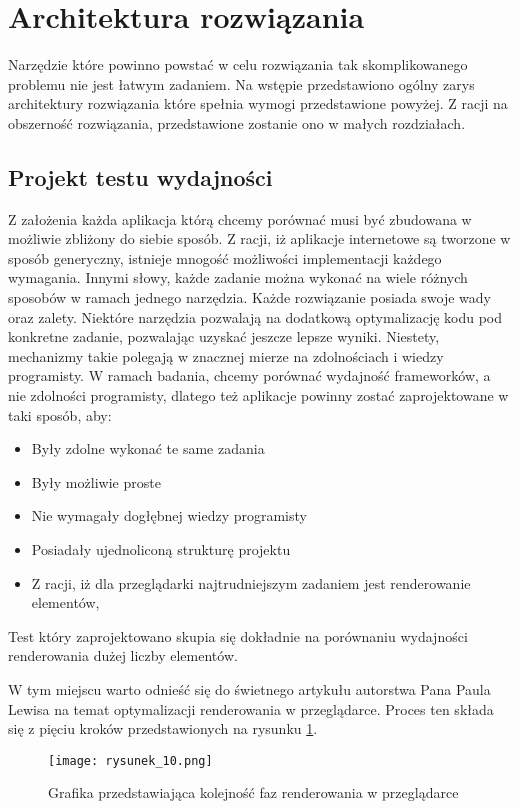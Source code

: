 \section{Architektura rozwiązania}

Narzędzie które powinno powstać w celu rozwiązania tak skomplikowanego problemu nie jest łatwym zadaniem.
Na wstępie przedstawiono ogólny zarys architektury rozwiązania które spełnia wymogi przedstawione powyżej.
Z racji na obszerność rozwiązania, przedstawione zostanie ono w małych rozdziałach.

\subsection{Projekt testu wydajności}
Z założenia każda aplikacja którą chcemy porównać musi być zbudowana w możliwie zbliżony do siebie sposób.
Z racji, iż aplikacje internetowe są tworzone w sposób generyczny, istnieje mnogość możliwości implementacji każdego wymagania.
Innymi słowy, każde zadanie można wykonać na wiele różnych sposobów w ramach jednego narzędzia.
Każde rozwiązanie posiada swoje wady oraz zalety. Niektóre narzędzia pozwalają na dodatkową optymalizację kodu pod konkretne zadanie, pozwalając uzyskać jeszcze lepsze wyniki.
Niestety, mechanizmy takie polegają w znacznej mierze na zdolnościach i wiedzy programisty.
W ramach badania, chcemy porównać wydajność frameworków, a nie zdolności programisty, dlatego też aplikacje powinny zostać zaprojektowane w taki sposób, aby:
\begin{itemize}
    \item Były zdolne wykonać te same zadania
    \item Były możliwie proste
    \item Nie wymagały dogłębnej wiedzy programisty
    \item Posiadały ujednoliconą strukturę projektu
    \item Z racji, iż dla przeglądarki najtrudniejszym zadaniem jest renderowanie elementów,     
\end{itemize}
Test który zaprojektowano skupia się dokładnie na porównaniu wydajności renderowania dużej liczby elementów.

W tym miejscu warto odnieść się do świetnego artykułu autorstwa Pana Paula Lewisa \cite{rendering-performance} na temat optymalizacji renderowania w przeglądarce. Proces ten składa się z pięciu kroków przedstawionych na rysunku \ref{fig:rysunek_10}. 

\begin{figure}[!ht]
    \centering
    \texttt{[image: rysunek\_10.png]}
    \caption{Grafika przedstawiająca kolejność faz renderowania w przeglądarce}
    \label{fig:rysunek_10}
\end{figure}

